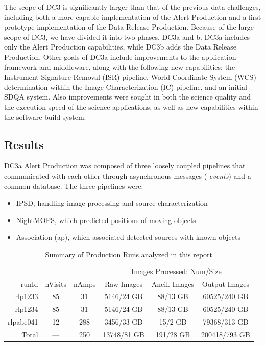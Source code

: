 The scope of DC3 is significantly larger than that of the previous
data challenges, including both a more capable implementation of the
Alert Production and a first prototype implementation of the Data
Release Production.  Because of the large scope of DC3, we have
divided it into two phases, DC3a and b.  DC3a includes only the Alert
Production capabilities, while DC3b adds the Data Release Production.
Other goals of DC3a include improvements to the application framework
and middleware, along with the following new capabilities: the
Instrument Signature Removal (ISR) pipeline, World Coordinate System
(WCS) determination within the Image Characterization (IC) pipeline,
and an initial SDQA system. Also improvements were sought in both the
science quality and the execution speed of the science applications,
as well as new capabilities within the software build system.

\subsection*{Results}

DC3a Alert Production was composed of three loosely coupled pipelines
that communicated with each other through asynchronous messages ({\it
events}) and a common database.  The three pipelines were:
\begin{itemize}
\item IPSD, handling image processing and source characterization
\item NightMOPS, which predicted positions of moving objects
\item Association (ap), which associated detected sources with known objects
\end{itemize}

\begin{table}[bp]
\centering
\caption{Summary of Production Runs analyzed in this report
\label{tbl:runsummary}}
\vspace{\baselineskip}
\begin{tabular}{rccccc}
\hline\hline
          &         &       & \multicolumn{3}{c}{Images Processed: Num/Size} \\
runId     & nVisits & nAmps & Raw Images & Ancil. Images & Output Images \\ \hline
rlp1233   & 85      & 31  & 5146/24 GB    & 88/13 GB       & 60525/240 GB \\ 
rlp1234   & 85      & 31  & 5146/24 GB    & 88/13 GB       & 60525/240 GB \\ 
rlpabe041 & 12      & 288 & 3456/33 GB    & 15/2 GB        & 79368/313 GB \\ \hline
Total     & ---     & 250 & 13748/81 GB   & 191/28 GB      & 200418/793 GB \\ \hline
\end{tabular}
\end{table}

